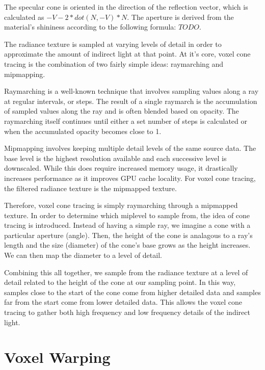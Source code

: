 The specular cone is oriented in the direction of the reflection vector, which is calculated as $-V - 2 * dot(N, -V) * N$. The aperture is derived from the material's shininess according to the following formula: $TODO$.

The radiance texture is sampled at varying levels of detail in order to approximate the amount of indirect light at that point. At it's core, voxel cone tracing is the combination of two fairly simple ideas: raymarching and mipmapping.

Raymarching is a well-known technique that involves sampling values along a ray at regular intervals, or steps. The result of a single raymarch is the accumulation of sampled values along the ray and is often blended based on opacity. The raymarching itself continues until either a set number of steps is calculated or when the accumulated opacity becomes close to 1.

Mipmapping involves keeping multiple detail levels of the same source data. The base level is the highest resolution available and each successive level is downscaled. While this does require increased memory usage, it drastically increases performance as it improves GPU cache locality. For voxel cone tracing, the filtered radiance texture is the mipmapped texture.

Therefore, voxel cone tracing is simply raymarching through a mipmapped texture. In order to determine which miplevel to sample from, the idea of cone tracing is introduced. Instead of having a simple ray, we imagine a cone with a particular aperture (angle). Then, the height of the cone is analagous to a ray's length and the size (diameter) of the cone's base grows as the height increases. We can then map the diameter to a level of detail.

Combining this all together, we sample from the radiance texture at a level of detail related to the height of the cone at our sampling point. In this way, samples close to the start of the cone come from higher detailed data and samples far from the start come from lower detailed data. This allows the voxel cone tracing to gather both high frequency and low frequency details of the indirect light.

\section{Voxel Warping}

